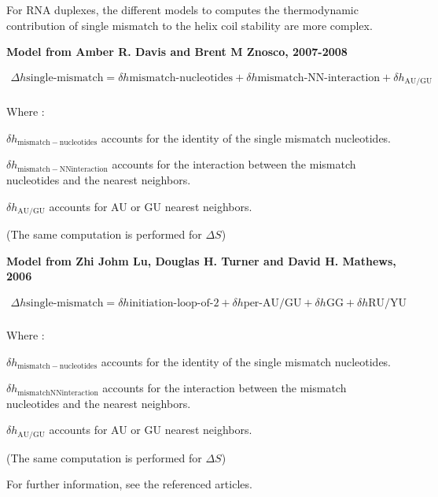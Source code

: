 \documentclass{article}
\begin{document}
For RNA duplexes, the different models to computes the thermodynamic contribution of single mismatch to the helix coil 
stability are more complex.

\textbf{Model from Amber R. Davis and Brent M Znosco, 2007-2008}

\begin{multline*}
\Delta h {\mbox{single-mismatch}} = 
\delta h {\mbox{mismatch-nucleotides}} +
\delta h {\mbox{mismatch-NN-interaction}} +
\delta{}h_\mathrm{AU/GU} \\
\end{multline*}

Where :

$\delta{}h_\mathrm{mismatch-nucleotides}$ accounts for the identity of the single mismatch nucleotides.

$\delta{}h_\mathrm{mismatch-NN interaction}$ accounts for the interaction between the mismatch nucleotides and the nearest neighbors.

$\delta{}h_\mathrm{AU/GU}$ accounts for AU or GU nearest neighbors.

       (The same computation is performed for $\Delta S$)

\textbf{Model from Zhi Johm Lu, Douglas H. Turner and David H. Mathews, 2006}

\begin{multline*}
\Delta h {\mbox{single-mismatch}} =
\delta h {\mbox{initiation-loop-of-2}} +
\delta h {\mbox{per-AU/GU}} +
\delta h {\mbox{GG}} +
\delta h {\mbox{RU/YU}}\\
\end{multline*}

Where :

$\delta{}h_\mathrm{mismatch-nucleotides}$ accounts for the identity of the single mismatch nucleotides.

$\delta{}h_\mathrm{mismatch NN interaction}$ accounts for the interaction between the mismatch nucleotides and the nearest neighbors.

$\delta{}h_\mathrm{AU/GU}$ accounts for AU or GU nearest neighbors.

       (The same computation is performed for $\Delta S$)
       
For further information, see the referenced articles.
\end{document}
